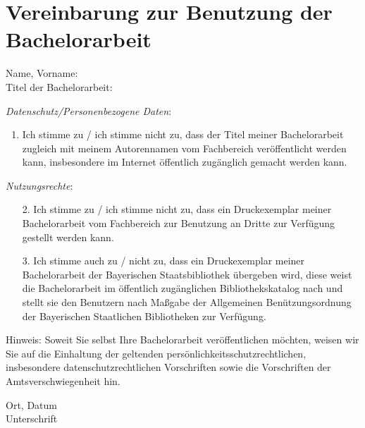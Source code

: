 \chapter*{Vereinbarung zur Benutzung der Bachelorarbeit}
\vspace{1cm}
Name, Vorname: \\

Titel der Bachelorarbeit: \\

\vspace{2cm}

\textit{Datenschutz/Personenbezogene Daten}:
\begin{enumerate}
\item Ich stimme zu / ich stimme nicht zu, dass der Titel meiner Bachelorarbeit zugleich mit meinem Autorennamen vom Fachbereich veröffentlicht werden kann, insbesondere im Internet öffentlich zugänglich gemacht werden kann. 
\end{enumerate}

\textit{Nutzungsrechte}:
\begin{enumerate}
\item[2.] Ich stimme zu / ich stimme nicht zu, dass ein Druckexemplar meiner Bachelorarbeit vom Fachbereich zur Benutzung an Dritte zur Verfügung gestellt werden kann.
\item[3.] Ich stimme auch zu / nicht zu, dass ein Druckexemplar meiner Bachelorarbeit der Bayerischen Staatsbibliothek übergeben wird, diese weist die Bachelorarbeit im öffentlich zugänglichen Bibliothekskatalog nach und stellt sie den Benutzern nach Maßgabe der Allgemeinen Benützungsordnung der Bayerischen Staatlichen Bibliotheken zur Verfügung.
\end{enumerate}

Hinweis: Soweit Sie selbst Ihre Bachelorarbeit veröffentlichen möchten, weisen wir Sie auf die Einhaltung der geltenden persönlichkeitsschutzrechtlichen, insbesondere datenschutzrechtlichen Vorschriften sowie die Vorschriften der Amtsverschwiegenheit hin. \vspace{2cm}

Ort, Datum \\

Unterschrift

